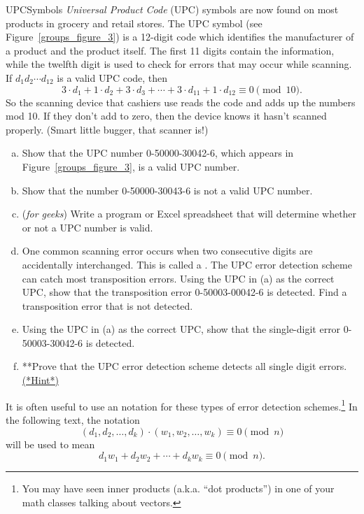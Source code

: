\begin{exercise}{UPCSymbols} \emph{Universal Product Code}
 (UPC) symbols are now found on most 
products in grocery and retail stores. The UPC symbol (see Figure~\ref{groups_figure_3}) is a 12-digit
code which identifies the manufacturer of a product and the product itself. The first 11 digits contain the information, while the twelfth digit is used to check for errors that may occur while scanning. If $d_1 d_2
\cdots d_{12}$ is a valid UPC code, then  
\[
3 \cdot d_1 + 1 \cdot d_2 + 3 \cdot d_3 + \cdots + 3 \cdot
d_{11} + 1 \cdot d_{12} \equiv 0 \pmod{10}.
\]
So the scanning device that cashiers use reads the code and adds up the numbers mod 10. If they don't add to zero, then the device knows it hasn't scanned properly. 
(Smart little bugger, that scanner is!)

\begin{enumerate}[(a)]
\item
Show that the UPC number  0-50000-30042-6, which appears in
Figure~\ref{groups_figure_3}, is a valid UPC number. 
 
\item
Show that the number 0-50000-30043-6 is not a valid UPC number.
 
\item (\emph{for geeks}) Write a program or Excel spreadsheet that will determine whether or not a UPC number is valid. 

\item
One common scanning error occurs when two consecutive digits are accidentally interchanged. This is called a . 
The  UPC error detection scheme can catch most transposition errors.  Using the UPC in (a) as the correct UPC, show that the transposition error 0-50003-00042-6 is detected.  Find a transposition error that is not detected. 

\item
 Using the UPC in (a) as the correct UPC, show that the single-digit error 0-50003-30042-6 is detected.  
\item
**Prove that the UPC error detection scheme detects all single digit errors. 
\hyperref[sec:modular_arithmetic:hints]{(*Hint*)}   
\end{enumerate}
\end{exercise} 
 

It is often useful to use an  notation for these types of error detection schemes.\footnote{You may have seen inner products (a.k.a. ``dot products'') in one of your math classes talking about vectors.} In the following text, the notation
\[
(d_1, d_2, \ldots, d_k ) \cdot (w_1, w_2, \ldots, w_k ) \equiv 0 \pmod{ n }
\]
will be used to mean
\[
d_1 w_1 +  d_2 w_2 + \cdots +  d_k w_k  \equiv 0  \pmod{ n}.
\]

